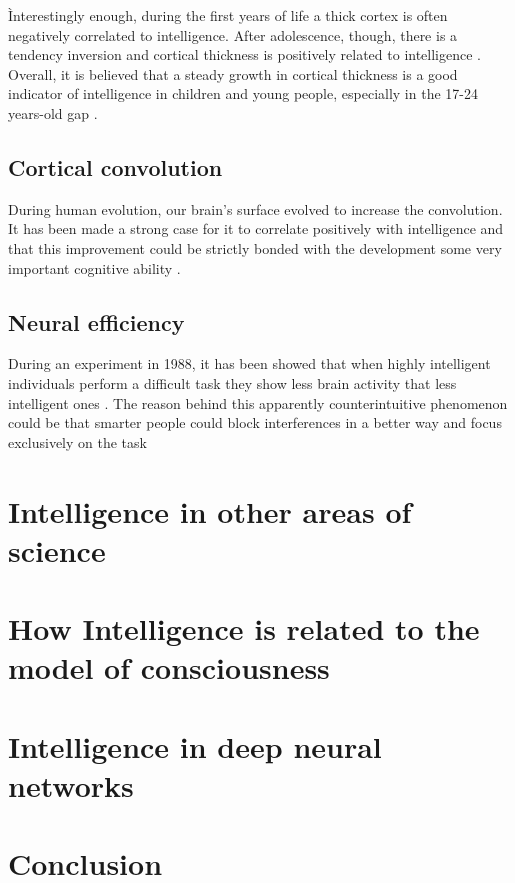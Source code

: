 \documentclass[conference]{IEEEtran}
\begin{document}
		Ìnterestingly enough, during the first years of life a thick cortex is often negatively correlated to intelligence. \cite{ct1} After adolescence, though, there is a tendency inversion and cortical thickness is positively related to intelligence \cite{c2}.
		Overall, it is believed that a steady growth in cortical thickness is a good indicator of intelligence in children and young people, especially in the 17-24 years-old gap \cite{ct1}.

	\subsection{Cortical convolution}\label{CC}

		During human evolution, our brain's surface evolved to increase the convolution. It has been made a strong case for it to correlate positively with intelligence and that this improvement could be strictly bonded with the development some very important cognitive ability \cite{cc1}.

	\subsection{Neural efficiency}\label{NE}

		During an experiment in 1988, it has been showed that when highly intelligent individuals perform a difficult task they show less brain activity that less intelligent ones \cite{c6}. The reason behind this apparently counterintuitive phenomenon could be that smarter people could block interferences in a better way and focus exclusively on the task \cite{ne1}


\section{Intelligence in other areas of science}


\section{How Intelligence is related to the model of consciousness}


\section{Intelligence in deep neural networks}


\section{Conclusion}
\end{document}
